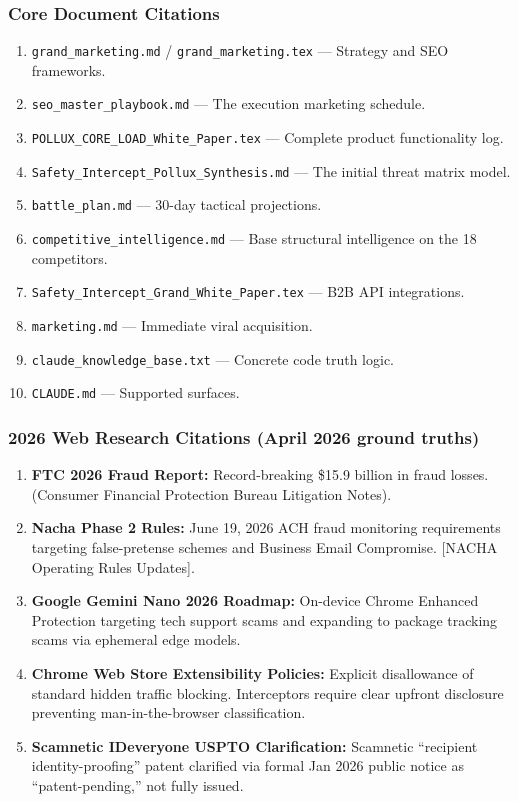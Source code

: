\documentclass[
]{article}
\providecommand{\tightlist}{%
  \setlength{\itemsep}{0pt}\setlength{\parskip}{0pt}}
\begin{document}
\subsubsection{Core Document Citations}\label{core-document-citations}

\begin{enumerate}
\def\labelenumi{\arabic{enumi}.}
\tightlist
\item
  \texttt{grand\_marketing.md} / \texttt{grand\_marketing.tex} ---
  Strategy and SEO frameworks.
\item
  \texttt{seo\_master\_playbook.md} --- The execution marketing
  schedule.
\item
  \texttt{POLLUX\_CORE\_LOAD\_White\_Paper.tex} --- Complete product
  functionality log.
\item
  \texttt{Safety\_Intercept\_Pollux\_Synthesis.md} --- The initial
  threat matrix model.
\item
  \texttt{battle\_plan.md} --- 30-day tactical projections.
\item
  \texttt{competitive\_intelligence.md} --- Base structural intelligence
  on the 18 competitors.
\item
  \texttt{Safety\_Intercept\_Grand\_White\_Paper.tex} --- B2B API
  integrations.
\item
  \texttt{marketing.md} --- Immediate viral acquisition.
\item
  \texttt{claude\_knowledge\_base.txt} --- Concrete code truth logic.
\item
  \texttt{CLAUDE.md} --- Supported surfaces.
\end{enumerate}

\subsubsection{2026 Web Research Citations (April 2026 ground
truths)}\label{web-research-citations-april-2026-ground-truths}

\begin{enumerate}
\def\labelenumi{\arabic{enumi}.}
\tightlist
\item
  \textbf{FTC 2026 Fraud Report:} Record-breaking \$15.9 billion in
  fraud losses. (Consumer Financial Protection Bureau Litigation Notes).
\item
  \textbf{Nacha Phase 2 Rules:} June 19, 2026 ACH fraud monitoring
  requirements targeting false-pretense schemes and Business Email
  Compromise. {[}NACHA Operating Rules Updates{]}.
\item
  \textbf{Google Gemini Nano 2026 Roadmap:} On-device Chrome Enhanced
  Protection targeting tech support scams and expanding to package
  tracking scams via ephemeral edge models.
\item
  \textbf{Chrome Web Store Extensibility Policies:} Explicit
  disallowance of standard hidden traffic blocking. Interceptors require
  clear upfront disclosure preventing man-in-the-browser classification.
\item
  \textbf{Scamnetic IDeveryone USPTO Clarification:} Scamnetic
  ``recipient identity-proofing'' patent clarified via formal Jan 2026
  public notice as ``patent-pending,'' not fully issued.
\end{enumerate}
\end{document}
